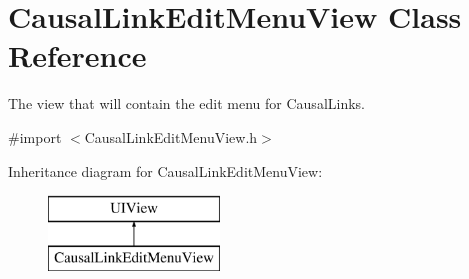 \hypertarget{interface_causal_link_edit_menu_view}{\section{Causal\-Link\-Edit\-Menu\-View Class Reference}
\label{interface_causal_link_edit_menu_view}
}


The view that will contain the edit menu for Causal\-Links.  




{\ttfamily \#import $<$Causal\-Link\-Edit\-Menu\-View.\-h$>$}

Inheritance diagram for Causal\-Link\-Edit\-Menu\-View\-:\begin{figure}[H]
\begin{center}
\leavevmode
\includegraphics[height=2.000000cm]{interface_causal_link_edit_menu_view}
\end{center}
\end{figure}
